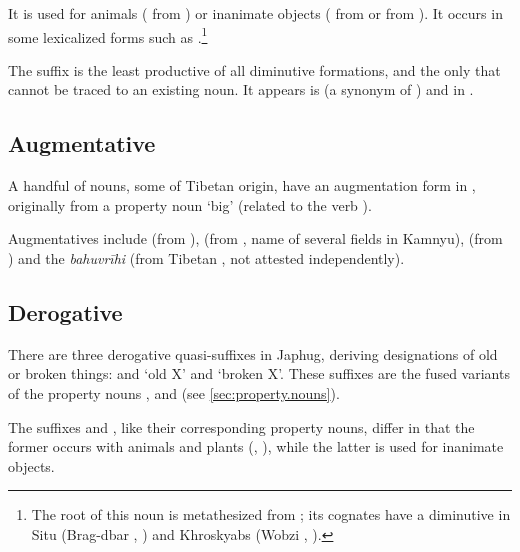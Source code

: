 It is  used for animals ( from ) or inanimate objects ( from  or  from ). It occurs in some lexicalized forms such as .\footnote{The root of this noun is metathesized from ; its cognates have a  diminutive in Situ (Brag-dbar , \citealt[228]{zhang16bragdbar}) and Khroskyabs (Wobzi , \citealt[115]{lai17khroskyabs}).}

The suffix  is the least productive of all diminutive formations, and the only that cannot be traced to an existing noun. It appears is  (a synonym of ) and in .

\subsection{Augmentative} \label{sec:augmentative}
A handful of nouns, some of Tibetan origin, have an augmentation form in , originally from a property noun  `big' (related to the verb ).

Augmentatives include  (from ),  (from , name of several fields in Kamnyu),  (from ) and the \textit{bahuvrīhi}  (from Tibetan , not attested independently).

\subsection{Derogative} \label{sec:derogative}
There are three derogative quasi-suffixes in Japhug, deriving designations of old or broken things:  and  `old X' and  `broken X'. These suffixes are the fused variants of the property nouns ,  and   (see \ref{sec:property.nouns}). 

The suffixes  and , like their corresponding property nouns, differ in that the former occurs with animals and plants (, ), while the latter is used for inanimate objects.

